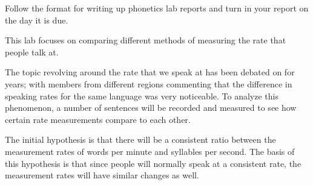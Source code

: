 \documentclass[lab=1,title={Speaking rate},turnin=false]{com310lab}
\begin{document}
\begin{writeup}
	Follow the format for writing up phonetics lab reports and turn in your report on the day it is due.
\end{writeup}

\pagebreak

\labtitle

\begin{topic}
	This lab focuses on comparing different methods of measuring the rate that people talk at.
\end{topic}

\begin{issue}%
	The topic revolving around the rate that we speak at has been debated on for years;
	with members from different regions commenting that the difference in speaking rates for the same language was very noticeable.
	To analyze this phenomenon, a number of sentences will be recorded and measured to see how certain rate measurements compare to each other.
\end{issue}

\begin{hypothesis}%
	The initial hypothesis is that there will be a consistent ratio between the measurement rates of words per minute and syllables per second.
	The basis of this hypothesis is that since people will normally speak at a consistent rate, the measurement rates will have similar changes as well.
\end{hypothesis}
\end{document}
